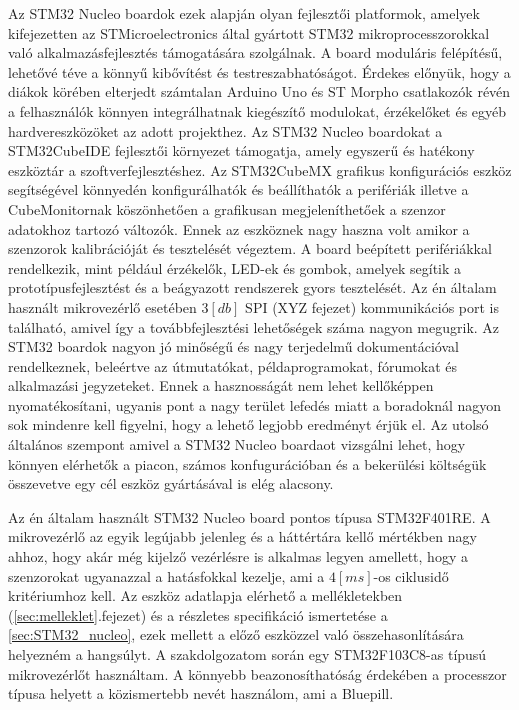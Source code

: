 Az STM32 Nucleo boardok ezek alapján olyan fejlesztői platformok, amelyek kifejezetten az STMicroelectronics által gyártott STM32 mikroprocesszorokkal való alkalmazásfejlesztés támogatására szolgálnak. A board moduláris felépítésű, lehetővé téve a könnyű kibővítést és testreszabhatóságot. Érdekes előnyük, hogy a diákok körében elterjedt számtalan Arduino Uno és ST Morpho csatlakozók révén a felhasználók könnyen integrálhatnak kiegészítő modulokat, érzékelőket és egyéb hardvereszközöket az adott projekthez. Az STM32 Nucleo boardokat a STM32CubeIDE fejlesztői környezet támogatja, amely egyszerű és hatékony eszköztár a szoftverfejlesztéshez. Az STM32CubeMX grafikus konfigurációs eszköz segítségével könnyedén konfigurálhatók és beállíthatók a perifériák illetve a CubeMonitornak köszönhetően a grafikusan megjeleníthetőek a szenzor adatokhoz tartozó változók. Ennek az eszköznek nagy haszna volt amikor a szenzorok kalibrációját és tesztelését végeztem. A board beépített perifériákkal rendelkezik, mint például érzékelők, LED-ek és gombok, amelyek segítik a prototípusfejlesztést és a beágyazott rendszerek gyors tesztelését. Az én általam használt mikrovezérlő esetében $3[db]$ SPI (XYZ fejezet) kommunikációs port is található, amivel így a továbbfejlesztési lehetőségek száma nagyon megugrik. Az STM32 boardok nagyon jó minőségű és nagy terjedelmű dokumentációval rendelkeznek, beleértve az útmutatókat, példaprogramokat, fórumokat és alkalmazási jegyzeteket. Ennek a hasznosságát nem lehet kellőképpen nyomatékosítani, ugyanis pont a nagy terület lefedés miatt a boradoknál nagyon sok mindenre kell figyelni, hogy a lehető legjobb eredményt érjük el. Az utolsó általános szempont amivel a STM32 Nucleo boardaot vizsgálni lehet, hogy könnyen elérhetők a piacon, számos konfugurációban és a bekerülési költségük összevetve egy cél eszköz gyártásával is elég alacsony.

Az én általam használt STM32 Nucleo board pontos típusa STM32F401RE. A mikrovezérlő az egyik legújabb jelenleg és a háttértára kellő mértékben nagy ahhoz, hogy akár még kijelző vezérlésre is alkalmas legyen amellett, hogy a szenzorokat ugyanazzal a hatásfokkal kezelje, ami a $4[ms]$-os ciklusidő kritériumhoz kell. Az eszköz adatlapja elérhető a mellékletekben (\ref{sec:melleklet}.fejezet) és a részletes specifikáció ismertetése a \ref{sec:STM32_nucleo}, ezek mellett a előző eszközzel való összehasonlítására helyezném a hangsúlyt. A szakdolgozatom során egy STM32F103C8-as típusú mikrovezérlőt használtam. A könnyebb beazonosíthatóság érdekében a processzor típusa helyett a közismertebb nevét használom, ami a Bluepill.

